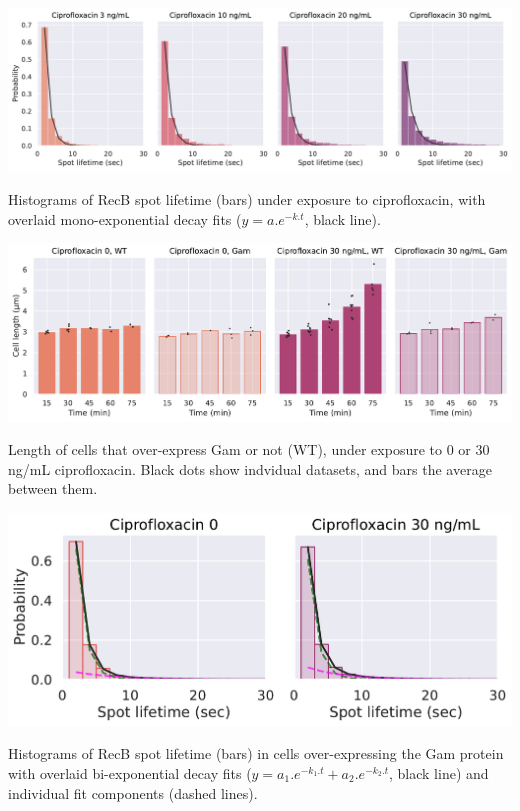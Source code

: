 \begin{suppfigure*}[htbp]
\begin{center}
\includegraphics[width=\linewidth]{SI_Figures/Monoexp_fits_cipro.pdf}
\end{center}
\caption{Histograms of RecB spot lifetime (bars) under exposure to ciprofloxacin, with overlaid mono-exponential decay fits ($y=a.e^{-k.t}$, black line).}
\label{SIFig:monoexp_fits}
\end{suppfigure*}


\begin{suppfigure*}[htbp]
    \begin{center}
    \includegraphics[width=\linewidth]{SI_Figures/Cell_length_Gam.pdf}
    \end{center}
    \caption{Length of cells that over-express Gam or not (WT), under exposure to 0 or 30 ng/mL ciprofloxacin. Black dots show indvidual datasets, and bars the average between them.}
    \label{SIFig:Gam_cell_length}
\end{suppfigure*}

\begin{suppfigure*}[htbp]
    \begin{center}
    \includegraphics[width=0.6\linewidth]{SI_Figures/Gam_lifetimes_fits.pdf}
    \end{center}
    \caption{Histograms of RecB spot lifetime (bars) in cells over-expressing the Gam protein with overlaid bi-exponential decay fits ($y=a_1.e^{-k_1.t} + a_2.e^{-k_2.t}$, black line) and individual fit components (dashed lines).}
    \label{SIFig:Gam_RecB_lifetimes_fits}
\end{suppfigure*}

